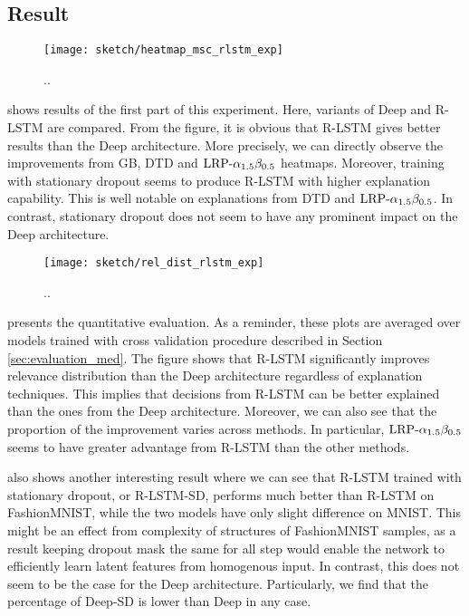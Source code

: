 \subsection{Result}
 \begin{figure}[!htb]
\centering
\texttt{[image: sketch/heatmap\_msc\_rlstm\_exp]}
\caption{..} 
\label{fig:heatmap_msc_rlstm_exp}
\end{figure}

\addfigure{\ref{fig:heatmap_msc_rlstm_exp}} shows results of the first part of this experiment. Here, variants of Deep and R-LSTM are compared. From the figure, it is obvious that R-LSTM gives better results than the Deep architecture. More precisely, we can directly observe the improvements from GB, DTD and $\text{LRP-}\alpha_{1.5}\beta_{0.5}$ heatmaps. Moreover, training with stationary dropout seems to produce R-LSTM with higher explanation capability. This is well notable on explanations from  DTD and $\text{LRP-}\alpha_{1.5}\beta_{0.5}$. In contrast, stationary dropout does not seem to have any prominent impact on the Deep architecture.


 \begin{figure}[!htb]
\centering
\texttt{[image: sketch/rel\_dist\_rlstm\_exp]}
\caption{..} 
\label{fig:rel_dist_rlstm_exp}
\end{figure}

\addfigure{\ref{fig:rel_dist_rlstm_exp}} presents the quantitative evaluation. As a reminder, these plots are averaged over models trained with cross validation procedure described in  Section \ref{sec:evaluation_med}. The figure shows that R-LSTM significantly improves relevance distribution than the Deep architecture regardless of explanation techniques.  This implies that decisions from R-LSTM can be better explained than the ones from the Deep architecture. Moreover, we can also see that the proportion of the improvement varies across methods. In particular, $\text{LRP-}\alpha_{1.5}\beta_{0.5}$ seems to have greater advantage from R-LSTM than the other methods.  

\addfigure{\ref{fig:rel_dist_rlstm_exp}}  also shows another interesting result where we can see that R-LSTM trained with stationary dropout, or R-LSTM-SD, performs much better than R-LSTM on FashionMNIST, while the two models have only slight difference on MNIST. This might be an effect from complexity of structures of FashionMNIST samples, as a result keeping dropout mask the same for all step would enable the network to efficiently learn latent features from homogenous input. In contrast, this does not seem to be the case for the Deep architecture. Particularly, we find that the percentage of Deep-SD is lower than Deep in any case.

